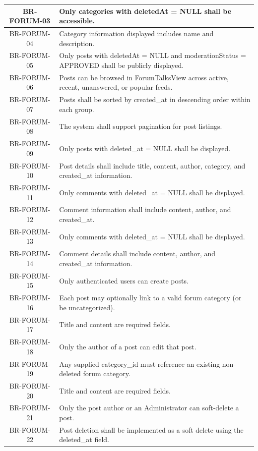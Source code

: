 \begin{longtable}{|c|p{12cm}|}
    BR-FORUM-03 & Only categories with deletedAt = NULL shall be accessible. \\ \hline
    BR-FORUM-04 & Category information displayed includes name and description. \\ \hline
    BR-FORUM-05 & Only posts with deletedAt = NULL and moderationStatus = APPROVED shall be publicly displayed. \\ \hline
    BR-FORUM-06 & Posts can be browsed in ForumTalksView across active, recent, unanswered, or popular feeds. \\ \hline
    BR-FORUM-07 & Posts shall be sorted by created\_at in descending order within each group. \\ \hline
    BR-FORUM-08 & The system shall support pagination for post listings. \\ \hline
    BR-FORUM-09 & Only posts with deleted\_at = NULL shall be displayed. \\ \hline
    BR-FORUM-10 & Post details shall include title, content, author, category, and created\_at information. \\ \hline
    BR-FORUM-11 & Only comments with deleted\_at = NULL shall be displayed. \\ \hline
    BR-FORUM-12 & Comment information shall include content, author, and created\_at. \\ \hline
    BR-FORUM-13 & Only comments with deleted\_at = NULL shall be displayed. \\ \hline
    BR-FORUM-14 & Comment details shall include content, author, and created\_at information. \\ \hline
    BR-FORUM-15 & Only authenticated users can create posts. \\ \hline
    BR-FORUM-16 & Each post may optionally link to a valid forum category (or be uncategorized). \\ \hline
    BR-FORUM-17 & Title and content are required fields. \\ \hline
    BR-FORUM-18 & Only the author of a post can edit that post. \\ \hline
    BR-FORUM-19 & Any supplied category\_id must reference an existing non-deleted forum category. \\ \hline
    BR-FORUM-20 & Title and content are required fields. \\ \hline
    BR-FORUM-21 & Only the post author or an Administrator can soft-delete a post. \\ \hline
    BR-FORUM-22 & Post deletion shall be implemented as a soft delete using the deleted\_at field. \\ \hline

\end{longtable}
